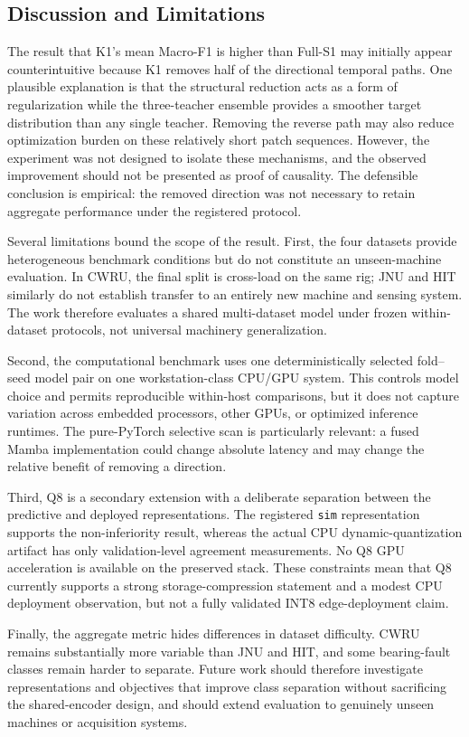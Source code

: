\subsection{Discussion and Limitations}
\label{subsec:limitations}

The result that K1's mean Macro-F1 is higher than Full-S1 may initially appear counterintuitive because K1 removes half of the directional temporal paths. One plausible explanation is that the structural reduction acts as a form of regularization while the three-teacher ensemble provides a smoother target distribution than any single teacher. Removing the reverse path may also reduce optimization burden on these relatively short patch sequences. However, the experiment was not designed to isolate these mechanisms, and the observed improvement should not be presented as proof of causality. The defensible conclusion is empirical: the removed direction was not necessary to retain aggregate performance under the registered protocol.

Several limitations bound the scope of the result. First, the four datasets provide heterogeneous benchmark conditions but do not constitute an unseen-machine evaluation. In CWRU, the final split is cross-load on the same rig; JNU and HIT similarly do not establish transfer to an entirely new machine and sensing system. The work therefore evaluates a shared multi-dataset model under frozen within-dataset protocols, not universal machinery generalization.

Second, the computational benchmark uses one deterministically selected fold--seed model pair on one workstation-class CPU/GPU system. This controls model choice and permits reproducible within-host comparisons, but it does not capture variation across embedded processors, other GPUs, or optimized inference runtimes. The pure-PyTorch selective scan is particularly relevant: a fused Mamba implementation could change absolute latency and may change the relative benefit of removing a direction.

Third, Q8 is a secondary extension with a deliberate separation between the predictive and deployed representations. The registered \texttt{sim} representation supports the non-inferiority result, whereas the actual CPU dynamic-quantization artifact has only validation-level agreement measurements. No Q8 GPU acceleration is available on the preserved stack. These constraints mean that Q8 currently supports a strong storage-compression statement and a modest CPU deployment observation, but not a fully validated INT8 edge-deployment claim.

Finally, the aggregate metric hides differences in dataset difficulty. CWRU remains substantially more variable than JNU and HIT, and some bearing-fault classes remain harder to separate. Future work should therefore investigate representations and objectives that improve class separation without sacrificing the shared-encoder design, and should extend evaluation to genuinely unseen machines or acquisition systems.
